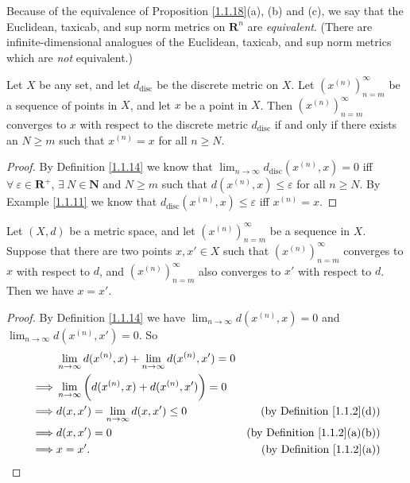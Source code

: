 \begin{note}
    Because of the equivalence of Proposition \ref{1.1.18}(a), (b) and (c), we say that the Euclidean, taxicab, and sup norm metrics on \(\mathbf{R}^n\) are \emph{equivalent}.
    (There are infinite-dimensional analogues of the Euclidean, taxicab, and sup norm metrics which are \emph{not} equivalent.)
\end{note}

\begin{proposition}\label{1.1.19}
    Let \(X\) be any set, and let \(d_{\text{disc}}\) be the discrete metric on \(X\).
    Let \((x^{(n)})_{n = m}^\infty\) be a sequence of points in \(X\), and let \(x\) be a point in \(X\).
    Then \((x^{(n)})_{n = m}^\infty\) converges to \(x\) with respect to the discrete metric \(d_{\text{disc}}\) if and only if there exists an \(N \geq m\) such that \(x^{(n)} = x\) for all \(n \geq N\).
\end{proposition}

\begin{proof}
    By Definition \ref{1.1.14} we know that \(\lim_{n \to \infty} d_{\text{disc}}(x^{(n)}, x) = 0\) iff \(\forall\ \varepsilon \in \mathbf{R}^+\), \(\exists\ N \in \mathbf{N}\) and \(N \geq m\) such that \(d(x^{(n)}, x) \leq \varepsilon\) for all \(n \geq N\).
    By Example \ref{1.1.11} we know that \(d_{\text{disc}}(x^{(n)}, x) \leq \varepsilon\) iff \(x^{(n)} = x\).
\end{proof}

\begin{proposition}\label{1.1.20}
    Let \((X, d)\) be a metric space, and let \((x^{(n)})_{n = m}^\infty\) be a sequence in \(X\).
    Suppose that there are two points \(x, x' \in X\) such that \((x^{(n)})_{n = m}^\infty\) converges to \(x\) with respect to \(d\), and \((x^{(n)})_{n = m}^\infty\) also converges to \(x'\) with respect to \(d\).
    Then we have \(x = x'\).
\end{proposition}

\begin{proof}
    By Definition \ref{1.1.14} we have \(\lim_{n \to \infty} d(x^{(n)}, x) = 0\) and \(\lim_{n \to \infty} d(x^{(n)}, x') = 0\).
    So
    \begin{align*}
                 & \lim_{n \to \infty} d(x^{(n)}, x) + \lim_{n \to \infty} d(x^{(n)}, x') = 0                                            \\
        \implies & \lim_{n \to \infty} \bigg(d(x^{(n)}, x) + d(x^{(n)}, x')\bigg) = 0                                                    \\
        \implies & d(x, x') = \lim_{n \to \infty} d(x, x') \leq 0                             & \text{(by Definition \ref{1.1.2}(d))}    \\
        \implies & d(x, x') = 0                                                               & \text{(by Definition \ref{1.1.2}(a)(b))} \\
        \implies & x = x'.                                                                    & \text{(by Definition \ref{1.1.2}(a))}
    \end{align*}
\end{proof}

